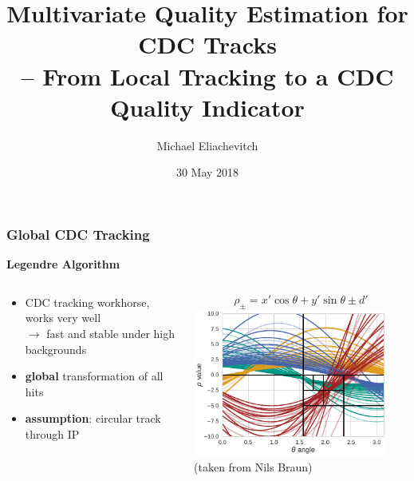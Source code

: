\documentclass[18pt, aspectratio=169]{beamer}
\title[Track Quality Estimation for CDC Tracking]{Multivariate Quality Estimation for CDC Tracks\\
  -- From Local Tracking to a CDC Quality Indicator}
\author{Michael Eliachevitch}
\date{30 May 2018}
\institute{ETP - KIT}
\newcommand{\greenbold}[1]{\textcolor{kit-green100}{\bf{#1}}}
\begin{document}

\begin{frame}
  \titlepage
\end{frame}

\begin{frame}
  \frametitle{Global CDC Tracking}
  \textbf{Legendre Algorithm}
  \begin{columns}
    \begin{column}{.5\textwidth}
      \begin{itemize}
      \item CDC tracking workhorse, works very well\\
        $\rightarrow$ fast and stable under high backgrounds
      \item \greenbold{global} transformation of all hits
      \item \greenbold{assumption}: circular track through IP
      \end{itemize}
      
    \end{column}
    \begin{column}{.5\textwidth}
      \begin{equation*}
        \rho_\pm = x'\cos{\theta} + y'\sin{\theta} \pm d'
      \end{equation*}
      \includegraphics[width=0.9\textwidth]{figures/legendre_rho-theta_space.pdf}\\
      \footnotesize{(taken from Nils Braun)}
    \end{column}

  \end{columns}
\end{frame}
\end{document}

